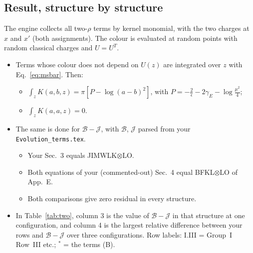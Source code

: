 \documentclass[10pt]{article}
\numberwithin{equation}{section}
\newcommand{\BB}{\mathcal B}
\newcommand{\JJ}{\mathcal J}
\begin{document}
\subsection{Result, structure by structure}
The engine collects all two-$\rho$ terms by kernel monomial, with the two charges at $x$ and $x'$ (both assignments). The colour is evaluated at random points with random classical charges and $U=U^T$.
\begin{itemize}
\item Terms whose colour does not depend on $U(z)$ are integrated over $z$ with Eq.~\eqref{eq:msbar}. Then:
\begin{itemize}
\item $\int_zK(a,b,z)=\pi[P-\log(a-b)^2]$, with $P=-\frac2\epsilon-2\gamma_E-\log\frac{\mu^2}{4}$;
\item $\int_zK(a,a,z)=0$.
\end{itemize}
\item The same is done for $\BB-\JJ$, with $\BB$, $\JJ$ parsed from your \texttt{Evolution\_terms.tex}.
\begin{itemize}
\item Your Sec.~3 equals JIMWLK$\otimes$LO.
\item Both equations of your (commented-out) Sec.~4 equal BFKL$\otimes$LO of App.~E.
\item Both comparisons give zero residual in every structure.
\end{itemize}
\item In Table~\ref{tab:two}, column 3 is the value of $\BB-\JJ$ in that structure at one configuration, and column 4 is the largest relative difference between your rows and $\BB-\JJ$ over three configurations. Row labels: I.III = Group~I Row~III etc.; ${}^{*}$ = the terms (B).
\end{itemize}
\end{document}
